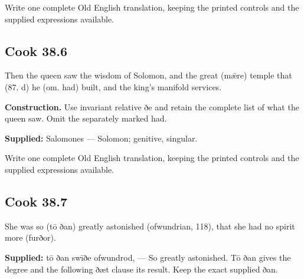 Write one complete Old English translation, keeping the printed controls and the supplied expressions available.

\par\begin{minipage}{\linewidth}\raggedright
\subsection*{Cook 38.6}

Then the queen saw the wisdom of Solomon, and the great (mǣre) temple that (87. d) he (om. had) built, and the king’s manifold services.

\textbf{Construction.} Use invariant relative ðe and retain the complete list of what the queen saw. Omit the separately marked had.

\textbf{Supplied:} Salomones — Solomon; genitive, singular.

Write one complete Old English translation, keeping the printed controls and the supplied expressions available.

\end{minipage}\par\addvspace{4pt}

\par\begin{minipage}{\linewidth}\raggedright
\subsection*{Cook 38.7}

She was so (tō ðan) greatly astonished (ofwundrian, 118), that she had no spirit more (furðor).

\end{minipage}\par\addvspace{4pt}

\textbf{Supplied:} tō ðan swīðe ofwundrod, — So greatly astonished. Tō ðan gives the degree and the following ðæt clause its result. Keep the exact supplied ðan.

